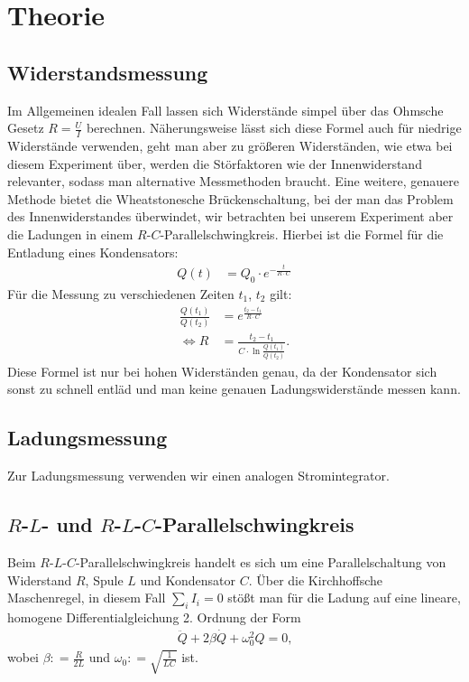 \section{Theorie}
\subsection{Widerstandsmessung}
Im Allgemeinen idealen Fall lassen sich Widerstände simpel über das Ohmsche Gesetz $ R = \frac{U}{I} $ berechnen. Näherungsweise lässt sich diese Formel auch für niedrige Widerstände verwenden, geht man aber zu größeren Widerständen, wie etwa bei diesem Experiment über, werden die Störfaktoren wie der Innenwiderstand relevanter, sodass man alternative Messmethoden braucht. Eine weitere, genauere Methode bietet die Wheatstonesche Brückenschaltung, bei der man das Problem des Innenwiderstandes überwindet, wir betrachten bei unserem Experiment aber die Ladungen in einem $ R $-$ C $-Parallelschwingkreis. Hierbei ist die Formel für die Entladung eines Kondensators:
\begin{align}
Q(t) & = Q_0 \cdot e^{- \frac{t}{R \cdot C}}
\end{align}
Für die Messung zu verschiedenen Zeiten $t_1$, $t_2$ gilt:
\begin{align}
\frac{Q(t_1)}{Q(t_2)} & = e^{\frac{t_2 - t_1}{R \cdot C}} \\
\Leftrightarrow R & = \frac{t_2 - t_1}{C \cdot \ln{ \frac{Q(t_1)}{Q(t_2)}}} \text{.}
\end{align}
Diese Formel ist nur bei hohen Widerständen genau, da der Kondensator sich sonst zu schnell entläd und man keine genauen Ladungswiderstände messen kann.
\subsection{Ladungsmessung}
Zur Ladungsmessung verwenden wir einen analogen Stromintegrator.
\subsection{$R$-$L$- und $R$-$L$-$C$-Parallelschwingkreis}
Beim $ R $-$ L $-$ C $-Parallelschwingkreis handelt es sich um eine Parallelschaltung von Widerstand $ R $, Spule $ L $ und Kondensator $ C $. Über die Kirchhoffsche Maschenregel, in diesem Fall $ \sum_i I_i = 0 $ stößt man für die Ladung auf eine lineare, homogene Differentialgleichung 2. Ordnung der Form
\begin{align}
\ddot{Q} + 2 \beta \dot{Q} + \omega_{0}^2 Q = 0 \text{,}
\end{align}
wobei $ \beta : = \frac{R}{2L} $ und $ \omega_{0} : = \sqrt{ \frac{1}{LC}} $ ist.